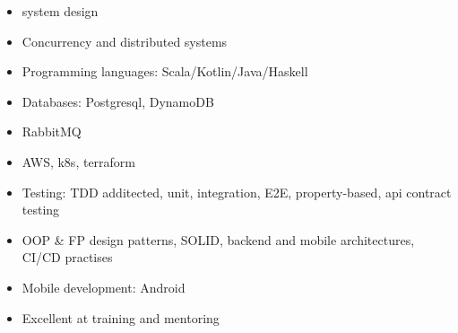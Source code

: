  \begin{multicols}{2}
    \begin{itemize}
      \item system design
      \item Concurrency and distributed systems 
	    \item Programming languages: Scala/Kotlin/Java/Haskell
        \item Databases: Postgresql, DynamoDB
          \item  RabbitMQ
        \item AWS, k8s, terraform
	    \item Testing: TDD additected, unit, integration, E2E, property-based, api contract testing
	    \item OOP \& FP design patterns, SOLID, backend and mobile architectures,
	    CI/CD practises 
        \item Mobile development: Android 
	    \item Excellent at training and mentoring 
    \end{itemize}
 \end{multicols}
